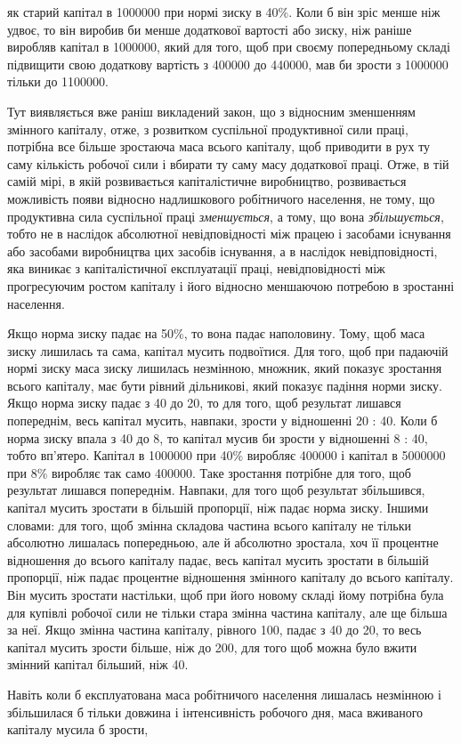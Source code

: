 \parcont{}  %
як старий капітал в \num{1000000} при нормі зиску в 40\%. Коли б він
зріс менше ніж удвоє, то він виробив би менше додаткової
вартості або зиску, ніж раніше виробляв капітал в \num{1000000},
який для того, щоб при своєму попередньому складі підвищити
свою додаткову вартість з \num{400000} до \num{440000}, мав би зрости
з \num{1000000} тільки до \num{1100000}.

Тут виявляється вже раніш викладений закон, що з відносним
зменшенням змінного капіталу, отже, з розвитком суспільної
продуктивної сили праці, потрібна все більше зростаюча маса
всього капіталу, щоб приводити в рух ту саму кількість робочої
сили і вбирати ту саму масу додаткової праці. Отже, в тій
самій мірі, в якій розвивається капіталістичне виробництво, розвивається
можливість появи відносно надлишкового робітничого
населення, не тому, що продуктивна сила суспільної праці \emph{зменшується},
а тому, що вона \emph{збільшується}, тобто не в наслідок
абсолютної невідповідності між працею і засобами існування
або засобами виробництва цих засобів існування, а в наслідок
невідповідності, яка виникає з капіталістичної експлуатації праці,
невідповідності між прогресуючим ростом капіталу і його відносно
меншаючою потребою в зростанні населення.

Якщо норма зиску падає на 50\%, то вона падає наполовину.
Тому, щоб маса зиску лишилась та сама, капітал мусить подвоїтися.
Для того, щоб при падаючій нормі зиску маса зиску лишилась
незмінною, множник, який показує зростання всього капіталу,
має бути рівний дільникові, який показує падіння норми зиску.
Якщо норма зиску падає з 40 до 20, то для того, щоб результат
лишався попереднім, весь капітал мусить, навпаки, зрости у відношенні
20 : 40. Коли б норма зиску впала з 40 до 8, то капітал
мусив би зрости у відношенні 8 : 40, тобто вп’ятеро. Капітал
в \num{1000000} при 40\% виробляє \num{400000} і капітал в \num{5000000} при 8\%
виробляє так само \num{400000}. Таке зростання потрібне для того, щоб
результат лишався попереднім. Навпаки, для того щоб результат
збільшився, капітал мусить зростати в більшій пропорції, ніж
падає норма зиску. Іншими словами: для того, щоб змінна складова
частина всього капіталу не тільки абсолютно лишалась
попередньою, але й абсолютно зростала, хоч її процентне відношення
до всього капіталу падає, весь капітал мусить зростати
в більшій пропорції, ніж падає процентне відношення змінного
капіталу до всього капіталу. Він мусить зростати настільки,
щоб при його новому складі йому потрібна була для купівлі
робочої сили не тільки стара змінна частина капіталу, але ще
більша за неї. Якщо змінна частина капіталу, рівного 100,
падає з 40 до 20, то весь капітал мусить зрости більше, ніж до
200, для того щоб можна було вжити змінний капітал більший,
ніж 40.

Навіть коли б експлуатована маса робітничого населення
лишалась незмінною і збільшилася б тільки довжина і інтенсивність
робочого дня, маса вживаного капіталу мусила б зрости,
\parbreak{}  %
